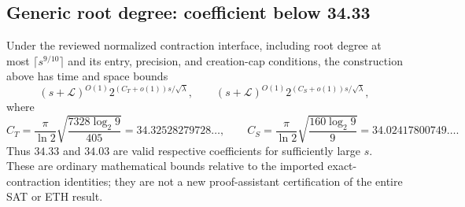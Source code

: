 \subsection{Generic root degree: coefficient below 34.33}

\begin{theorem}\label{cached:generic}
Under the reviewed normalized contraction interface, including root degree
at most $\lceil s^{9/10}\rceil$ and its entry, precision, and creation-cap
conditions, the construction above has time and space bounds
\[
 (s+\mathcal L)^{O(1)}2^{(C_T+o(1))s/\sqrt\lambda},\qquad
 (s+\mathcal L)^{O(1)}2^{(C_S+o(1))s/\sqrt\lambda},
\]
where
\[
 C_T=\frac\pi{\ln2}\sqrt{\frac{7328\log_2 9}{405}}
     =34.32528279728\ldots,
 \qquad
 C_S=\frac\pi{\ln2}\sqrt{\frac{160\log_2 9}{9}}
     =34.02417800749\ldots.
\]
Thus $34.33$ and $34.03$ are valid respective coefficients for sufficiently
large $s$. These are ordinary mathematical bounds relative to the imported
exact-contraction identities; they are not a new proof-assistant certification
of the entire SAT or ETH result.
\end{theorem}
